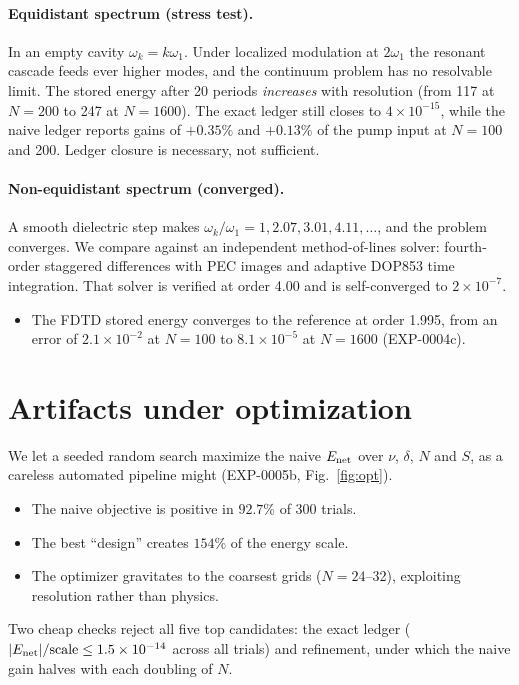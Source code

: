 \documentclass[aps,pre,reprint,superscriptaddress,amsmath,amssymb]{revtex4-2}
\begin{document}
\paragraph{Equidistant spectrum (stress test).} In an empty cavity
$\omega_k=k\omega_1$. Under localized modulation at $2\omega_1$ the resonant
cascade feeds ever higher modes, and the continuum problem has no resolvable
limit. The stored energy after 20 periods \emph{increases} with resolution (from
117 at $N=200$ to 247 at $N=1600$). The exact ledger still closes to
$4\times10^{-15}$, while the naive ledger reports gains of $+0.35\%$ and $+0.13\%$
of the pump input at $N=100$ and 200. Ledger closure is necessary, not sufficient.

\paragraph{Non-equidistant spectrum (converged).} A smooth dielectric step makes
$\omega_k/\omega_1=1, 2.07, 3.01, 4.11,\dots$, and the problem converges. We compare
against an independent method-of-lines solver: fourth-order staggered differences
with PEC images and adaptive DOP853 time integration. That solver is verified at
order 4.00 and is self-converged to $2\times10^{-7}$.
\begin{itemize}
\item The FDTD stored energy converges to the reference at order 1.995, from an
  error of $2.1\times10^{-2}$ at $N=100$ to $8.1\times10^{-5}$ at $N=1600$
  (EXP-0004c).
\end{itemize}

\section{Artifacts under optimization}

We let a seeded random search maximize the naive $E_{\rm net}$ over $\nu$, $\delta$,
$N$ and $S$, as a careless automated pipeline might (EXP-0005b, Fig.~\ref{fig:opt}).
\begin{itemize}
\item The naive objective is positive in $92.7\%$ of 300 trials.
\item The best ``design'' creates $154\%$ of the energy scale.
\item The optimizer gravitates to the coarsest grids ($N=24$--32), exploiting
  resolution rather than physics.
\end{itemize}
Two cheap checks reject all five top candidates: the exact ledger
($|E_{\rm net}|/{\rm scale}\le1.5\times10^{-14}$ across all trials) and refinement,
under which the naive gain halves with each doubling of $N$.
\end{document}
